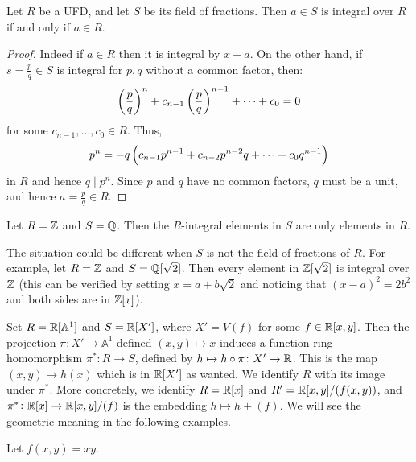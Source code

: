 \documentclass[11pt,a4paper]{article}
\newcommand{\A}{\mathbb A}
\begin{document}
\begin{proposition}
  Let $R$ be a UFD, and let $S$ be its field of fractions.
  Then $a \in S$ is integral over $R$ if and only if $a \in R$.
\end{proposition}
\begin{proof}
  Indeed if $a \in R$ then it is integral by $x - a$.
  On the other hand, if $s = \frac{p}{q} \in S$ is integral
  for $p,q$ without a common factor, then:
  \[
    \del{\frac{p}{q}}^n + c_{n-1} \del{\frac{p}{q}}^{n-1} + \cdots + c_0 = 0
  \]
  for some $c_{n-1},\dots,c_0 \in R$.
  Thus,
  \[
    p^n = -q\del{c_{n-1} p^{n-1} + c_{n-2} p^{n-2}q + \cdots + c_0 q^{n-1}}
  \]
  in $R$ and hence $q \mid p^n$.
  Since $p$ and $q$ have no common factors, $q$ must be a unit,
  and hence $a = \frac{p}{q} \in R$.
\end{proof}

\begin{example}
  Let $R = \mathbb{Z}$ and $S = \mathbb{Q}$.
  Then the $R$-integral elements in $S$ are only elements in $R$.
\end{example}

\begin{remark}
  The situation could be different when $S$ is not the field of fractions
  of $R$.
  For example, let $R = \mathbb{Z}$ and $S = \mathbb{Q}[\sqrt{2}]$.
  Then every element in $\mathbb{Z}[\sqrt{2}]$ is integral over $\mathbb{Z}$
  (this can be verified by setting $x = a + b\sqrt{2}$ and noticing
  that $(x-a)^2 = 2b^2$ and both sides are in $\mathbb{Z}[x]$).
\end{remark}

\begin{remark}
  Set $R = \R[\A^1]$ and $S = \mathbb{R}[X']$,
  where $X' = V(f)$ for some $f \in \mathbb{R}[x,y]$.
  Then the projection $\pi \colon X' \to \A^1$
  defined $(x,y) \mapsto x$ induces a function ring
  homomorphism $\pi^* \colon R \to S$,
  defined by $h \mapsto h \circ \pi \colon X' \to \mathbb{R}$.
  This is the map $(x,y) \mapsto h(x)$ which is in $\mathbb{R}[X']$ as wanted.
  We identify $R$ with its image under $\pi^*$.
  More concretely, we identify $R = \mathbb{R}[x]$ and $R' = \mathbb{R}[x,y]/(f(x,y))$,
  and $\pi^* \colon \mathbb{R}[x] \to \mathbb{R}[x,y]/(f)$ is the embedding
  $h \mapsto h + (f)$.
  We will see the geometric meaning in the following examples.
\end{remark}

\begin{example}
  Let $f(x,y) = xy$. 
  \begin{center}
  \end{center}
\end{example}
\end{document}
